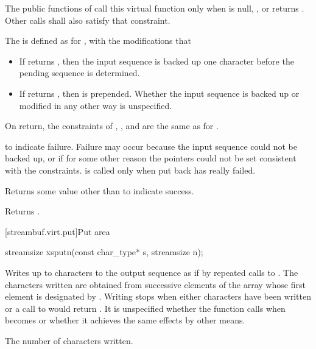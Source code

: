 \begin{itemdescr}
\pnum
\remarks
The public functions of
call this virtual function only when
is null,
,
or
returns
.
Other calls shall also satisfy that constraint.

The
is defined as for
,
with the modifications that
\begin{itemize}
\item
If
returns
,
then the input sequence is backed up one character before the pending sequence is determined.
\item
If
returns , then  is prepended.
Whether the input sequence is backed up or modified in any other way is unspecified.
\end{itemize}

\pnum
\postconditions
On return, the constraints of
,
,
and
are the same as for
.

\pnum
\returns
{}
to indicate failure.
Failure may occur because the input sequence could not be backed up, or if for some
other reason the pointers could not be set consistent with the constraints.
is called only when put back has really failed.

\pnum
Returns some value other than
to indicate success.

\pnum
{}
Returns
.
\end{itemdescr}

[streambuf.virt.put]{Put area}

%
\begin{itemdecl}
streamsize xsputn(const char_type* s, streamsize n);
\end{itemdecl}

\begin{itemdescr}
\pnum
\effects
Writes up to  characters to the output sequence as if
by repeated calls to
.
The characters written are obtained from successive elements of
the array whose first element is designated by .
Writing stops when either  characters have been written or
a call to
would return
.
It is unspecified whether the function calls  when  becomes  or whether it achieves the same effects by other means.

\pnum
\returns
The number of characters written.
\end{itemdescr}

